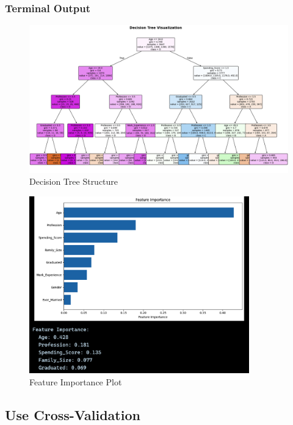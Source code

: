 \documentclass[12pt,a4paper]{article}
\begin{document}
\newpage
\subsubsection{Terminal Output}

\begin{figure}[h!]
    \centering
    \includegraphics[width=\textwidth]{Figures/decision_tree_viz.png}
    \caption{Decision Tree Structure}
    \label{fig:dt_structure}
\end{figure}

\begin{figure}[h!]
    \centering
    \includegraphics[width=0.85\textwidth]{Figures/feature_importance_plot.png}
    \caption{Feature Importance Plot}
    \label{fig:feature_importance}
\label{fig:dt_visualization}
\end{figure}

\newpage
\subsection{Use Cross-Validation}
\end{document}
